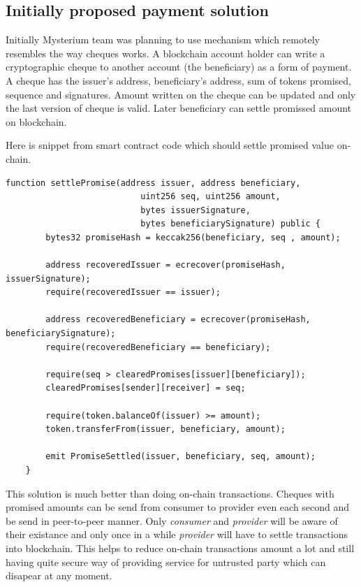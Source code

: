 \documentclass[a4paper,12pt]{article}
\begin{document}
\subsection{Initially proposed payment solution}

Initially Mysterium team was planning to use mechanism which remotely resembles 
the way cheques works. A blockchain account holder can write a cryptographic 
cheque to another account (the beneficiary) as a form of payment. A cheque has 
the issuer's address, beneficiary's address, sum of tokens promised, sequence 
and signatures. Amount written on the cheque can be updated and only the last 
version of cheque is valid. Later beneficiary can settle promissed amount on 
blockchain. 

Here is snippet from smart contract code which should settle promised value 
on-chain.
\begin{lstlisting}[basicstyle=\fontsize{9}{11}\sffamily]
    function settlePromise(address issuer, address beneficiary, 
                           uint256 seq, uint256 amount, 
                           bytes issuerSignature,
                           bytes beneficiarySignature) public {
        bytes32 promiseHash = keccak256(beneficiary, seq , amount);

        address recoveredIssuer = ecrecover(promiseHash, issuerSignature);
        require(recoveredIssuer == issuer);

        address recoveredBeneficiary = ecrecover(promiseHash, beneficiarySignature);
        require(recoveredBeneficiary == beneficiary);

        require(seq > clearedPromises[issuer][beneficiary]);
        clearedPromises[sender][receiver] = seq;

        require(token.balanceOf(issuer) >= amount);
        token.transferFrom(issuer, beneficiary, amount);

        emit PromiseSettled(issuer, beneficiary, seq, amount);
    }
\end{lstlisting}

This solution is much better than doing on-chain transactions. Cheques with 
promised amounts can be send from consumer to provider even each second and be
send in peer-to-peer manner. Only \textit{consumer} and \textit{provider} will
be aware of their existance and only once in a while \textit{provider} will have
to settle transactions into blockchain. This helps to reduce on-chain 
transactions amount a lot and still having quite secure way of providing service
for untrusted party which can disapear at any moment. 
\end{document}
